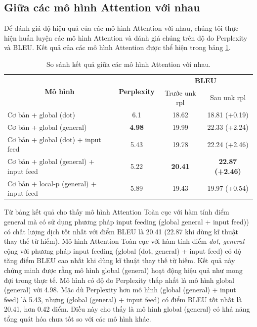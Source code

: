 \subsection{Giữa các mô hình Attention với nhau}
Để đánh giá độ hiệu quả của các mô hình Attention với nhau, chúng tôi thực hiện huấn luyện các mô hình Attention và đánh giá chúng trên độ đo Perplexity và BLEU. Kết quả của các mô hình Attention được thể hiện trong bảng \ref{tab_attn-vs-attn}. 



\begin{table}
	\centering
	\caption{So sánh kết quả giữa các mô hình Attention với nhau.}
	\begin{tabular}{|l|c|c|c|} 
		\hline
		\multicolumn{1}{|c|}{\multirow{2}{*}{ \textbf{Mô hình} }} & \multirow{2}{*}{\textbf{Perplexity } } & \multicolumn{2}{c|}{\textbf{BLEU } }       \\ 
		\cline{3-4}
		\multicolumn{1}{|c|}{}                                    &                                        & Trước unk rpl   & Sau unk rpl              \\ 
		\hline
		Cơ bản + global (dot)                                     & 6.1                                    & 18.62           & 18.81 (+0.19)            \\ 
		\hline
		Cơ bản + global (general)                                 & \textbf{4.98}                                   & 19.99           & 22.33 (+2.24)            \\ 
		\hline
		Cơ bản + global (dot) + input feed                        & 5.43                                   & 19.78           & 22.24 (+2.46)            \\ 
		\hline
		Cơ bản + global (general) + input feed                    & 5.22                                   & \textbf{20.41}  & \textbf{22.87 (+2.46)}   \\ 
		\hline
		Cơ bản + local-p (general) + input feed                   & 5.89                                   & 19.43           & 19.97 (+0.54)            \\
		\hline
	\end{tabular}
	\label{tab_attn-vs-attn}
\end{table}

Từ bảng kết quả cho thấy mô hình Attention Toàn cục với hàm tính điểm general mà có sử dụng phương pháp input feeding (global general + input feed)) có chất lượng dịch tốt nhất với điểm BLEU là 20.41 (22.87 khi dùng kĩ thuật thay thế từ hiếm). Mô hình Attention Toàn cục với hàm tính điểm \textit{dot, general} cộng với phương pháp input feeding (global (dot, general) + input feed) có độ tăng điểm BLEU cao nhất khi dùng kĩ thuật thay thế từ hiếm. Kết quả này chứng minh được rằng mô hình global (general) hoạt động hiệu quả như mong đợi trong thực tế.  Mô hình có độ đo Perplexity thấp nhất là mô hình global (general) với 4.98. Mặc dù Perplexity hơn mô hình (global (general) + input feed) là 5.43, nhưng (global (general) + input feed) có điểm BLEU tốt nhất là 20.41, hơn 0.42 điểm. Điều này cho thấy là mô hình global (general) có khả năng tổng quát hóa chưa tốt so với các mô hình khác.
 
